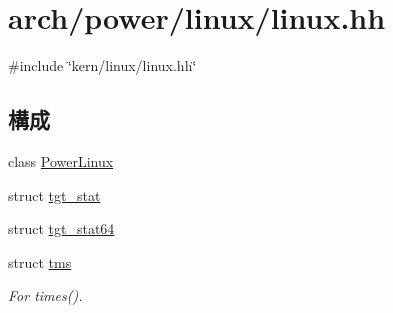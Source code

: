 \hypertarget{arch_2power_2linux_2linux_8hh}{
\section{arch/power/linux/linux.hh}
\label{arch_2power_2linux_2linux_8hh}
}
{\ttfamily \#include \char`\"{}kern/linux/linux.hh\char`\"{}}\par
\subsection*{構成}
\begin{DoxyCompactItemize}
\item 
class \hyperlink{classPowerLinux}{PowerLinux}
\item 
struct \hyperlink{structPowerLinux_1_1tgt__stat}{tgt\_\-stat}
\item 
struct \hyperlink{structPowerLinux_1_1tgt__stat64}{tgt\_\-stat64}
\item 
struct \hyperlink{structPowerLinux_1_1tms}{tms}
\begin{DoxyCompactList}\small\item\em For times(). \item\end{DoxyCompactList}\end{DoxyCompactItemize}
